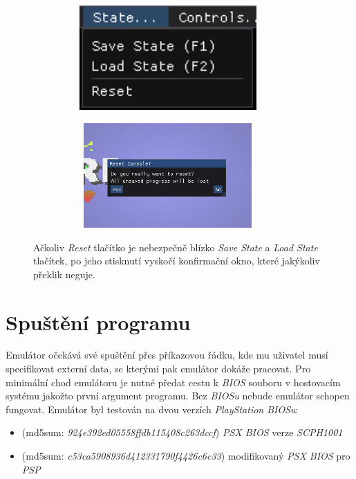 \begin{figure}[hbt]
    \begin{subfigure}{0.5\textwidth}
        \centering
        \includegraphics[width=0.9\textwidth, height=4cm]{obrazky-figures/reset-anti-pattern.png}
    \end{subfigure}
    \begin{subfigure}{0.5\textwidth}
        \centering
        \includegraphics[width=0.9\textwidth, height=4cm]{obrazky-figures/reset-confirmation.png}
    \end{subfigure}
    \caption[Prevence \textit{dark-patterns/anti-patterns}]{Ačkoliv \textit{Reset} tlačítko je nebezpečně blízko \textit{Save State} a \textit{Load State} tlačítek,
    po jeho stisknutí vyskočí konfirmační okno, které jakýkoliv překlik neguje.}
    \label{reset-confirmation}
\end{figure}

\section{Spuštění programu}

Emulátor očekává své spuštění přes příkazovou řádku, kde mu uživatel musí specifikovat externí data, se kterými pak emulátor dokáže pracovat.
Pro minimální chod emulátoru je nutné předat cestu k \textit{BIOS} souboru v hostovacím systému jakožto první argument programu. Bez \textit{BIOSu} nebude emulátor schopen fungovat.
Emulátor byl testován na dvou verzích \textit{PlayStation BIOSu}:

\begin{itemize}
    \item{(md5sum: \textit{924e392ed05558ffdb115408c263dccf}) \textit{PSX BIOS} verze \textit{SCPH1001}}
    \item{(md5sum: \textit{c53ca5908936d412331790f4426c6c33}) modifikovaný \textit{PSX BIOS} pro \textit{PSP}}
\end{itemize}


